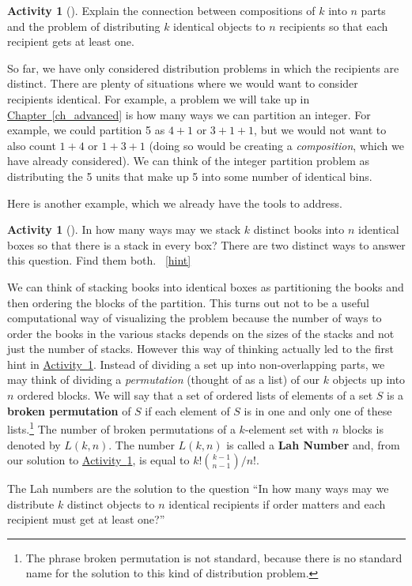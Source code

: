\documentclass[10pt,]{book}
\newcommand{\terminology}[1]{\textbf{#1}}
\theoremstyle{plain}
\theoremstyle{definition}
\theoremstyle{definition}
\theoremstyle{definition}
\newtheorem{activity}[project]{Activity}
\numberwithin{equation}{chapter}
\begin{document}
\begin{activity}[]\label{activity-68}
\hypertarget{p-437}{}%
Explain the connection between compositions of \(k\) into \(n\) parts and the problem of distributing \(k\) identical objects to \(n\) recipients so that each recipient gets at least one.%
\end{activity}
\hypertarget{p-439}{}%
So far, we have only considered distribution problems in which the recipients are distinct.  There are plenty of situations where we would want to consider recipients identical.  For example, a problem we will take up in \hyperref[ch_advanced]{Chapter~\ref{ch_advanced}} is how many ways we can partition an integer.  For example, we could partition 5 as \(4+1\) or \(3+1+1\), but we would not want to also count \(1+4\) or \(1+3+1\) (doing so would be creating a \emph{composition}, which we have already considered).  We can think of the integer partition problem as distributing the 5 units that make up 5 into some number of identical bins.%
\par
\hypertarget{p-440}{}%
Here is another example, which we already have the tools to address.%
\begin{activity}[]\label{brokenpermutation}
\hypertarget{p-441}{}%
In how many ways may we stack \(k\) distinct books into \(n\) identical boxes so that there is a stack in every box? There are two distinct ways to answer this question.  Find them both.%
~\hfill{\tiny\hyperlink{a-69}{[hint]}\hypertarget{q-69}{}}\end{activity}
\hypertarget{p-446}{}%
We can think of stacking books into identical boxes as partitioning the books and then ordering the blocks of the partition. This turns out not to be a useful computational way of visualizing the problem because the number of ways to order the books in the various stacks depends on the sizes of the stacks and not just the number of stacks. However this way of thinking actually led to the first hint in \hyperref[brokenpermutation]{Activity~\ref{brokenpermutation}}. Instead of dividing a set up into non-overlapping parts, we may think of dividing a \emph{permutation} (thought of as a list) of our \(k\) objects up into \(n\) ordered blocks. We will say that a set of ordered lists of elements of a set \(S\) is a \terminology{broken permutation}   of \(S\) if each element of \(S\) is in one and only one of these lists.\footnote{The phrase broken permutation is not standard, because there is no standard name for the solution to this kind  of distribution problem.\label{fn-3}} The number of broken permutations of a \(k\)-element set with \(n\) blocks is denoted by \(L(k,n)\). The number \(L(k,n)\) is called a \terminology{Lah Number} and, from our solution to \hyperref[brokenpermutation]{Activity~\ref{brokenpermutation}}, is equal to \(k!\binom{k-1}{n-1}/n!\).%
\par
\hypertarget{p-447}{}%
The Lah numbers are the solution to the question ``In how many ways may we distribute \(k\) distinct objects to \(n\) identical recipients if order matters and each recipient must get at least one?''%
\typeout{************************************************}
\typeout{************************************************}
\end{document}
